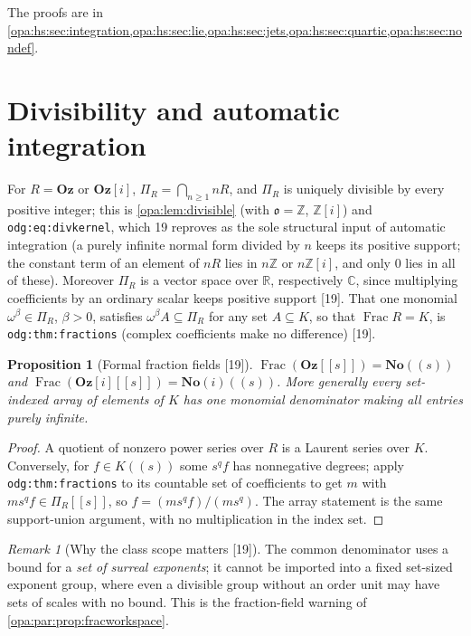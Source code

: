 \documentclass[11pt,oneside]{article}
\numberwithin{equation}{section}
\newtheorem{proposition}[proposition]{Proposition}
\theoremstyle{definition}
\theoremstyle{remark}
\newtheorem{remark}[remark]{Remark}
\newcommand{\No}{\mathbf{No}}
\newcommand{\Oz}{\mathbf{Oz}}
\newcommand{\Og}{\mathbf{Oz}[i]}
\newcommand{\SC}{\mathbf{No}(i)}
\newcommand{\R}{\mathbb R}
\newcommand{\C}{\mathbb C}
\newcommand{\Z}{\mathbb Z}
\newcommand{\oo}{\mathfrak o}
\newcommand{\Frac}{\operatorname{Frac}}
\newcommand{\src}[1]{\textup{\textsf{\small[#1]}}}
\newcommand{\lbl}[1]{\nolinkurl{#1}}
\begin{document}
The proofs are in \cref{opa:hs:sec:integration,opa:hs:sec:lie,opa:hs:sec:jets,opa:hs:sec:quartic,opa:hs:sec:nondef}.

\section{Divisibility and automatic integration}\label{opa:hs:sec:integration}

For $R=\Oz$ or $\Og$, $\Pi_R=\bigcap_{n\ge1}nR$, and $\Pi_R$ is uniquely divisible by every positive integer; this is \cref{opa:lem:divisible}
(with $\oo=\Z$, $\Z[i]$) and \lbl{odg:eq:divkernel}, which 19 reproves as the sole structural input of automatic integration (a purely
infinite normal form divided by $n$ keeps its positive support; the constant term of an element of $nR$ lies in $n\Z$ or $n\Z[i]$, and only
$0$ lies in all of these). Moreover $\Pi_R$ is a vector space over $\R$, respectively $\C$, since multiplying coefficients by an ordinary
scalar keeps positive support \src{19}. That one monomial $\omega^\beta\in\Pi_R$, $\beta>0$, satisfies $\omega^\beta A\subseteq\Pi_R$ for any set
$A\subseteq K$, so that $\Frac R=K$, is \lbl{odg:thm:fractions} (complex coefficients make no difference) \src{19}.

\begin{proposition}[Formal fraction fields \src{19}]\label{opa:hs:prop:formalfrac}
$\Frac(\Oz[[s]])=\No((s))$ and $\Frac(\Og[[s]])=\SC((s))$. More generally every set-indexed array of elements of $K$ has one monomial
denominator making all entries purely infinite.
\end{proposition}
\begin{proof}
A quotient of nonzero power series over $R$ is a Laurent series over $K$. Conversely, for $f\in K((s))$ some $s^qf$ has nonnegative degrees;
apply \lbl{odg:thm:fractions} to its countable set of coefficients to get $m$ with $ms^qf\in\Pi_R[[s]]$, so $f=(ms^qf)/(ms^q)$. The array
statement is the same support-union argument, with no multiplication in the index set.
\end{proof}

\begin{remark}[Why the class scope matters \src{19}]\label{opa:hs:rem:classscope}
The common denominator uses a bound for a \emph{set of surreal exponents}; it cannot be imported into a fixed set-sized exponent group, where
even a divisible group without an order unit may have sets of scales with no bound. This is the fraction-field warning of
\cref{opa:par:prop:fracworkspace}.
\end{remark}
\end{document}

